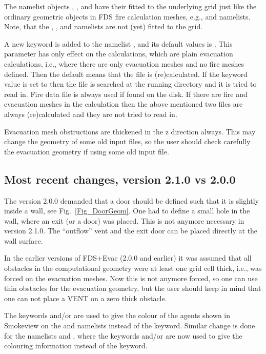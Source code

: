\documentclass[12pt,a4paper,final,twoside]{stylevk}
\begin{document}
\noindent The namelist objects , , and
 have their  fitted to the underlying grid just
like the ordinary geometric objects in FDS fire calculation meshes,
e.g.,  and  namelists.  Note, that the
, , and  namelists are not (yet)
fitted to the grid.


A new keyword  is added to the namelist
, and its default values is .  This
parameter has only effect on the calculations, which are plain
evacuation calculations, i.e., where there are only evacuation
meshes and no fire meshes defined.  Then the default 
means that the  file is (re)calculated.  If the
keyword value is set to  then the file
 is searched at the running directory and it is
tried to read in.  Fire data file  is always
used if found on the disk.  If there are fire and evacuation meshes in
the calculation then the above mentioned two files are always
(re)calculated and they are not tried to read in. 


Evacuation mesh obstructions are thickened in the z direction always.
This may change the geometry of some old input files, so the user
should check carefully the evacuation geometry if using some old input
file.


\subsection{Most recent changes, version 2.1.0 vs
  2.0.0}\label{Sec_210vs200} 

\noindent The version 2.0.0 demanded that a door should be defined
such that it is slightly inside a wall, see Fig.~\ref{Fig_DoorGeom}.
One had to define a small hole in the wall, where an exit (or a door)
was placed.  This is not anymore necessary in version 2.1.0.  The
``outflow'' vent and the exit door can be placed directly at the wall
surface.


In the earlier versions of FDS+Evac (2.0.0 and earlier) it was assumed
that all obstacles in the computational geometry were at least one
grid cell thick, i.e.,  was forced on
the evacuation meshes.  Now this is not anymore forced, so one can use
thin obstacles for the evacuation geometry, but the user should keep
in mind that one can not place a VENT on a zero thick obstacle.


The keywords  and/or  are used
to give the colour of the agents shown in Smokeview on the 
and  namelists instead of the  keyword.
Similar change is done for the namelists  and
, where the keywords  and/or  are
now used to give the colouring information instead of the
 keyword.
\end{document}
